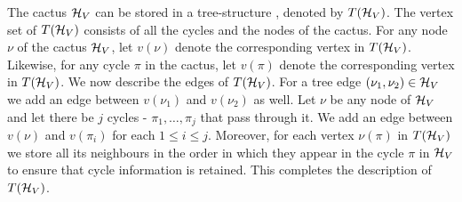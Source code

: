 



The cactus ${\cal H}_V$ can be stored in a tree-structure \cite{DBLP:journals/algorithmica/DinitzW98}, denoted by $T({\cal H}_V)$. The vertex set of $T({\cal H}_V)$ consists of all the cycles and the nodes of the cactus. For any node $\nu$ of the cactus ${\cal H}_V$, let $v(\nu)$ denote the corresponding vertex in $T({\cal H}_V)$. Likewise, for any cycle $\pi$ in the cactus, let $v(\pi)$ denote the corresponding vertex in $T({\cal H}_V)$. We now describe the edges of  $T({\cal H}_V)$. For a tree edge $(\nu_1,\nu_2) \in {\cal H}_V$ we add an edge between $v(\nu_1)$ and $v(\nu_2)$ as well.
Let $\nu$ be any node of ${\cal H}_V$ and let there be $j$ cycles - $\pi_1,\ldots,\pi_j$ that pass through it. We add an edge between $v(\nu)$ and $v(\pi_i)$ for each $1\le i\le j$. Moreover, for each vertex $\nu(\pi)$ in $T{({\cal H}_V)}$ we store all its neighbours in the order in which they appear in the cycle $\pi$ in ${\cal H}_V$ to ensure that cycle information is retained. This completes the description of $T({\cal H}_V)$. 

